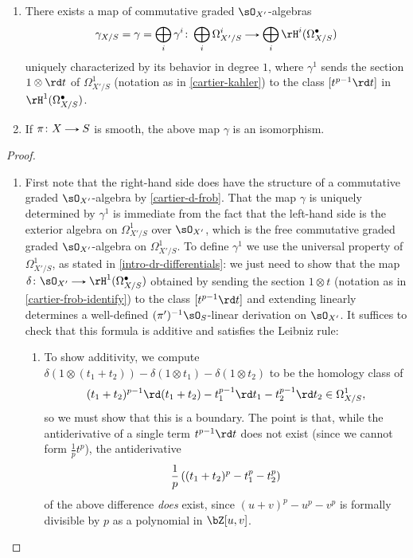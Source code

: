 \begin{theorem}
  \label{cartier-iso}
  \begin{enumerate}[leftmargin=*]
  \item \label{cartier-iso-map} There exists a map of commutative graded $\sO_{X'}$-algebras
    \[
      \gamma_{X/S} = \gamma = \bigoplus_i \gamma^i \c \bigoplus_i \Omega^i_{X'/S} \to \bigoplus_i \rH^i(\Omega_{X/S}^\bullet)
    \]
    uniquely characterized by its behavior in degree $1$, where $\gamma^1$ sends the section $1 \otimes \rd t$ of $\Omega^1_{X'/S}$ (notation as in \cref{cartier-kahler}) to the class $[t^{p-1}\rd t]$ in $\rH^1(\Omega_{X/S}^\bullet)$.
  \item \label{cartier-iso-iso} If $\pi \c X \to S$ is smooth, the above map $\gamma$ is an isomorphism.
  \end{enumerate}

  \begin{proof}
    \begin{enumerate}[leftmargin=*]
    \item First note that the right-hand side does have the structure of a commutative graded $\sO_{X'}$-algebra by \cref{cartier-d-frob}. That the map $\gamma$ is uniquely determined by $\gamma^1$ is immediate from the fact that the left-hand side is the exterior algebra on $\Omega^1_{X'/S}$ over $\sO_{X'}$, which is the free commutative graded graded $\sO_{X'}$-algebra on $\Omega_{X'/S}^1$. To define $\gamma^1$ we use the universal property of $\Omega_{X'/S}^1$, as stated in \cref{intro-dr-differentials}: we just need to show that the map $\delta \c \sO_{X'} \to \rH^1(\Omega_{X/S}^\bullet)$ obtained by sending the section $1 \otimes t$ (notation as in \cref{cartier-frob-identify}) to the class $[t^{p-1}\rd t]$ and extending linearly determines a well-defined $(\pi')^{-1}\sO_S$-linear derivation on $\sO_{X'}$. It suffices to check that this formula is additive and satisfies the Leibniz rule:
      \begin{enumerate}
      \item \label{cartier-iso-map-additive} To show additivity, we compute $\delta(1 \otimes (t_1 + t_2)) - \delta(1 \otimes t_1) - \delta(1 \otimes t_2)$ to be the homology class of
        \[
          (t_1+t_2)^{p-1} \rd(t_1 + t_2) - t_1^{p-1}\rd t_1 - t_2^{p-1}\rd t_2 \in \Omega^1_{X/S},
        \]
        so we must show that this is a boundary. The point is that, while the antiderivative of a single term $t^{p-1} \rd t$ does not exist (since we cannot form $\frac{1}{p} t^p$), the antiderivative
        \[
          \frac{1}{p}\left((t_1+t_2)^p - t_1^p - t_2^p\right)
        \]
        of the above difference \emph{does} exist, since $(u+v)^p - u^p - v^p$ is formally divisible by $p$ as a polynomial in $\bZ[u,v]$.


\end{enumerate}
\end{enumerate}
\end{proof}
\end{theorem}
